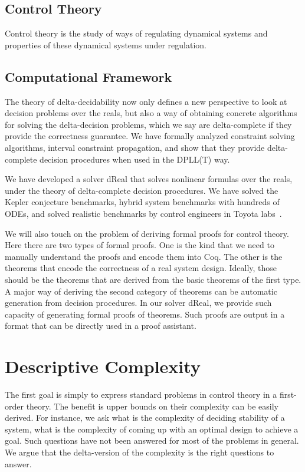 \documentclass[10pt]{article}
\theoremstyle{definition}
\begin{document}
\subsection{Control Theory} 

Control theory is the study of ways of regulating dynamical systems and properties of these dynamical systems under regulation. 


\subsection{Computational Framework}

The theory of delta-decidability now only defines a new perspective to look at decision problems over the reals, but also a way of obtaining concrete algorithms for solving the delta-decision problems, which we say are delta-complete if they provide the correctness guarantee. We have formally analyzed constraint solving algorithms, interval constraint propagation, and show that they provide delta-complete decision procedures when used in the DPLL(T) way. 

We have developed a solver dReal that solves nonlinear formulas over the reals, under the theory of delta-complete decision procedures. We have solved the Kepler conjecture benchmarks, hybrid system benchmarks with hundreds of ODEs, and solved realistic benchmarks by control engineers in Toyota labs~\cite{}. 

We will also touch on the problem of deriving formal proofs for control theory. Here there are two types of formal proofs. One is the kind that we need to manually understand the proofs and encode them into Coq. The other is the theorems that encode the correctness of a real system design. Ideally, those should be the theorems that are derived from the basic theorems of the first type. A major way of deriving the second category of theorems can be automatic generation from decision procedures. In our solver dReal, we provide such capacity of generating formal proofs of theorems. Such proofs are output in a format that can be directly used in a proof assistant. 


\section{Descriptive Complexity}

The first goal is simply to express standard problems in control theory in a first-order theory. The benefit is upper bounds on their complexity can be easily derived. For instance, we ask what is the complexity of deciding stability of a system, what is the complexity of coming up with an optimal design to achieve a goal. Such questions have not been answered for most of the problems in general. We argue that the delta-version of the complexity is the right questions to answer. 
\end{document}
